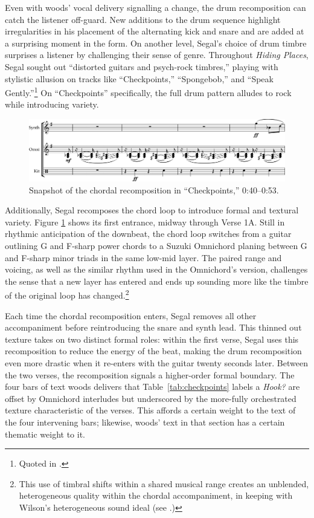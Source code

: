 Even with woods' vocal delivery signalling a change, the drum recomposition can catch the listener
off-guard. New additions to the drum sequence highlight irregularities in his placement of the 
alternating kick and snare and are added at a surprising moment in the form. On another level, 
Segal's choice of drum timbre surprises a listener by challenging their sense of genre. Throughout 
\textit{Hiding Places}, Segal sought out ``distorted guitars and psych-rock timbres,'' playing with
stylistic allusion on  tracks like ``Checkpoints,'' ``Spongebob,'' and ``Speak Gently.''\footnote{
    Quoted in \cite{backwoodzhiphopKennySegalPresents2019}.} 
On ``Checkpoints'' specifically, the full drum pattern alludes to rock while introducing variety.

    \begin{figure}[ht]
        \centering
        \includegraphics[width=\textwidth]{images/figures/chp 02/040053checkpointsrecomp.pdf}
        \caption{Snapshot of the chordal recomposition in ``Checkpoints,'' 0:40--0:53.}
        \label{fig:checkpointsrecomp}
    \end{figure}

Additionally, Segal recomposes the chord loop to introduce formal and textural variety. Figure
\ref{fig:checkpointsrecomp} shows its first entrance, midway through Verse 1A. Still in rhythmic 
anticipation of the downbeat, the chord loop switches from a guitar outlining G and F-sharp power
chords to a Suzuki Omnichord planing between G and F-sharp minor triads in the same low-mid layer.
The paired range and voicing, as well as the similar rhythm used in the Omnichord's version,
challenges the sense that a new layer has entered and ends up sounding more like the timbre of the
original loop has changed.\footnote{
    This use of timbral shifts within a shared musical range creates an unblended, heterogeneous 
    quality within the chordal accompaniment, in keeping with Wilson's heterogeneous 
    sound ideal (see \autocite[329]{ollywilsonHeterogeneousSoundIdeal1992}.)}

Each time the chordal recomposition enters, Segal removes all other accompaniment before reintroducing
the snare and synth lead. This thinned out texture takes on two distinct formal roles: within the first
verse, Segal uses this recomposition to reduce the energy of the beat, making the drum recomposition
even more drastic when it re-enters with the guitar twenty seconds later. Between the two verses,
the recomposition signals a higher-order formal boundary. The four bars of text woods delivers that
Table~\ref{tab:checkpoints} labels a \textit{Hook?} are offset by Omnichord interludes but underscored
by the more-fully orchestrated texture characteristic of the verses. This affords a certain weight to
the text of the four intervening bars; likewise, woods' text in that section has a certain thematic
weight to it.

